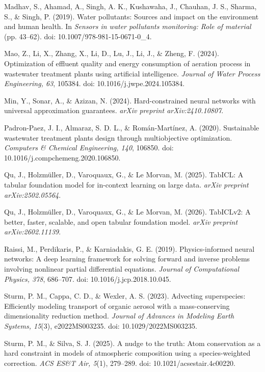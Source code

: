 \documentclass[a4paper,fleqn]{cas-sc}
\begin{document}
\noindent Madhav, S., Ahamad, A., Singh, A. K., Kushawaha, J., Chauhan, J. S., Sharma, S., \& Singh, P. (2019). Water pollutants: Sources and impact on the environment and human health. In \textit{Sensors in water pollutants monitoring: Role of material} (pp. 43--62). doi: 10.1007/978-981-15-0671-0\_4.

\noindent Mao, Z., Li, X., Zhang, X., Li, D., Lu, J., Li, J., \& Zheng, F. (2024). Optimization of effluent quality and energy consumption of aeration process in wastewater treatment plants using artificial intelligence. \textit{Journal of Water Process Engineering, 63}, 105384. doi: 10.1016/j.jwpe.2024.105384.

\noindent Min, Y., Sonar, A., \& Azizan, N. (2024). Hard-constrained neural networks with universal approximation guarantees. \textit{arXiv preprint arXiv:2410.10807}.

\noindent Padron-Paez, J. I., Almaraz, S. D. L., \& Rom\'an-Mart\'inez, A. (2020). Sustainable wastewater treatment plants design through multiobjective optimization. \textit{Computers \& Chemical Engineering, 140}, 106850. doi: 10.1016/j.compchemeng.2020.106850.

\noindent Qu, J., Holzm\"uller, D., Varoquaux, G., \& Le Morvan, M. (2025). TabICL: A tabular foundation model for in-context learning on large data. \textit{arXiv preprint arXiv:2502.05564}.

\noindent Qu, J., Holzm\"uller, D., Varoquaux, G., \& Le Morvan, M. (2026). TabICLv2: A better, faster, scalable, and open tabular foundation model. \textit{arXiv preprint arXiv:2602.11139}.

\noindent Raissi, M., Perdikaris, P., \& Karniadakis, G. E. (2019). Physics-informed neural networks: A deep learning framework for solving forward and inverse problems involving nonlinear partial differential equations. \textit{Journal of Computational Physics, 378}, 686--707. doi: 10.1016/j.jcp.2018.10.045.

\noindent Sturm, P. M., Cappa, C. D., \& Wexler, A. S. (2023). Advecting superspecies: Efficiently modeling transport of organic aerosol with a mass-conserving dimensionality reduction method. \textit{Journal of Advances in Modeling Earth Systems, 15}(3), e2022MS003235. doi: 10.1029/2022MS003235.

\noindent Sturm, P. M., \& Silva, S. J. (2025). A nudge to the truth: Atom conservation as a hard constraint in models of atmospheric composition using a species-weighted correction. \textit{ACS ES\&T Air, 5}(1), 279--289. doi: 10.1021/acsestair.4c00220.
\end{document}
